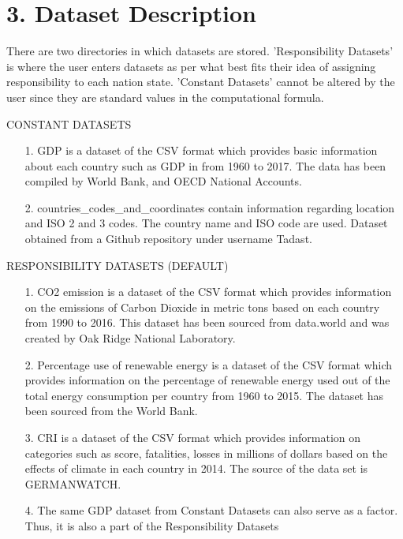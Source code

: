 \documentclass[fontsize=11pt]{article}
\begin{document}
    \section*{3. Dataset Description}

    There are two directories in which datasets are stored. 'Responsibility Datasets' is where the user enters datasets as per what best fits their idea of assigning responsibility to each nation state. 'Constant Datasets' cannot be altered by the user since they are standard values in the computational formula.


    \begin{center}
        CONSTANT DATASETS
    \end{center}

    \begin{enumerate}


        \item [1.] GDP is a dataset of the CSV format which provides basic information about each country such as GDP in from 1960 to 2017. The data has been compiled by World Bank, and OECD National Accounts.

        \item [2.]  countries\_codes\_and\_coordinates contain information regarding location and ISO 2 and 3 codes. The country name and ISO code are used. Dataset obtained from a Github repository under username Tadast.

    \end{enumerate} \newpage

    \begin{center}
        RESPONSIBILITY DATASETS (DEFAULT)
    \end{center}

    \begin{enumerate}
        \item [1.] CO2 emission is a dataset of the CSV format which provides information on the emissions of Carbon Dioxide in metric tons based on each country from 1990 to 2016. This dataset has been sourced from data.world and was created by Oak Ridge National Laboratory.

        \item [2.] Percentage use of renewable energy is a dataset of the CSV format which provides information on the percentage of renewable energy used out of the total energy consumption per country from 1960 to 2015. The dataset has been sourced from the World Bank.

        \item [3.] CRI is a dataset of the CSV format which provides information on categories such as score, fatalities, losses in millions of dollars based on the effects of climate in each country in 2014. The source of the data set is GERMANWATCH.

        \item [4.] The same GDP dataset from Constant Datasets can also serve as a factor. Thus, it is also a part of the Responsibility Datasets

    \end{enumerate}
\end{document}
